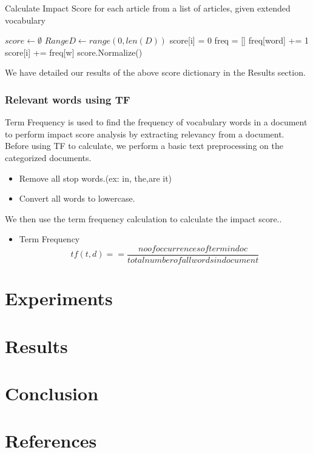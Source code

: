 \documentclass[paper=a4, fontsize=11pt]{scrartcl}
\numberwithin{equation}{section}		%
\numberwithin{figure}{section}			%
\numberwithin{table}{section}				%
\begin{document}
\begin {center}
\begin {algorithm}[ht]
\SetNoFillComment
\caption{Calculate Impact Score for each article from a list of articles, given extended vocabulary}
 {
    $score \gets \emptyset $\;
    $RangeD \gets range(0, len(D)) $\;
     {
    	score[i] = 0 \;
	freq = [] \;
	 {
		freq[word] += 1 \;
	}
	 {
		score[i] += freq[w] \;
	}
    }
    score.Normalize() \;
    \;
}
\end {algorithm}
\end {center}

We have detailed our results of the above score dictionary in the Results section.

\subsubsection {Relevant words using TF}

Term Frequency is used to find the frequency of vocabulary words in a document to perform impact score analysis by extracting relevancy from a document.
Before using TF to calculate, we perform a basic text preprocessing on the categorized documents.
\begin{itemize}
\item {Remove all stop words.(ex: in, the,are it)}
\item {Convert all words to lowercase.}
\end {itemize}

We then use the term frequency calculation to calculate the impact score..
\begin{itemize}
\item {Term Frequency}
\[tf(t,d) =  = \frac{no of occurrences of term in doc }{total number of all words in document}\]

\end{itemize}
\section{Experiments}

\section{Results}
\section{Conclusion}
\section{References}



\end{document}
